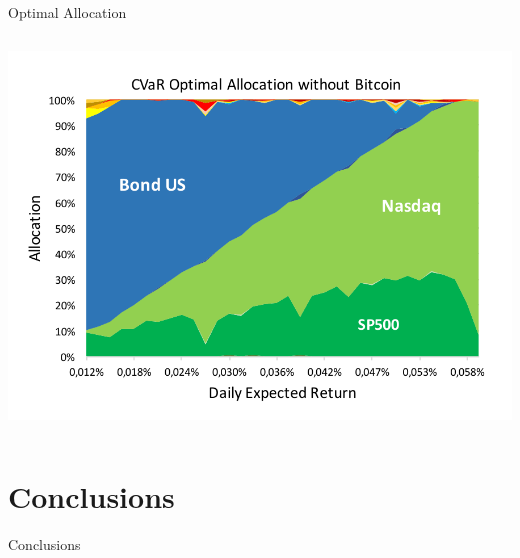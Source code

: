 \documentclass[c, 10pt]{beamer}
\begin{document}
\begin{frame}{Optimal Allocation}
\begin{columns}
\begin{column}{0.5\textwidth}
		\includegraphics[width=\textwidth]{Images/cvar_allocation_no_btc}
	\end{column}
\end{columns}
\end{frame}

\section{Conclusions}

\begin{frame}{Conclusions}
	
\end{frame}
\end{document}
